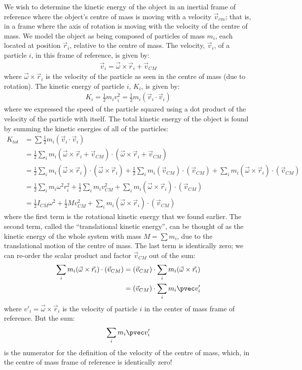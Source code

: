 We wish to determine the kinetic energy of the object in an inertial frame of reference where the object's centre of mass is moving with a velocity $\vec v_{cm}$; that is, in a frame where the axis of rotation is moving with the velocity of the centre of mass. We model the object as being composed of particles of mass $m_i$, each located at position $\vec r_i$, relative to the centre of mass. The velocity, $\vec v_i$, of a particle $i$, in this frame of reference, is given by:
\begin{align*}
\vec v_i = \vec\omega \times \vec r_i + \vec v_{CM}
\end{align*}
where $\vec\omega \times \vec r_i$ is the velocity of the particle as seen in the centre of mass (due to rotation). The kinetic energy of particle $i$, $K_i$, is given by:
\begin{align*}
K_i = \frac{1}{2}m_iv_i^2 = \frac{1}{2}m_i(\vec v_i\cdot \vec v_i)
\end{align*}
where we expressed the speed of the particle squared using a dot product of the velocity of the particle with itself. The total kinetic energy of the object is found by summing the kinetic energies of all of the particles:
\begin{align*}
K_{tot} &= \sum \frac{1}{2}m_i(\vec v_i\cdot \vec v_i) \\
&=\frac{1}{2} \sum_i m_i (\vec\omega \times \vec r_i + \vec v_{CM}) \cdot (\vec\omega \times \vec r_i + \vec v_{CM})\\
&=\frac{1}{2} \sum_i m_i (\vec\omega \times \vec r_i)\cdot(\vec\omega \times \vec r_i ) + \frac{1}{2} \sum_i m_i (\vec v_{CM}) \cdot (\vec v_{CM}) + \sum_i m_i (\vec\omega \times \vec r_i) \cdot (\vec v_{CM})\\
&=\frac{1}{2}  \sum_i m_i \omega^2r_i^2 + \frac{1}{2} \sum_i m_i v_{CM}^2 + \sum_i m_i (\vec\omega \times \vec r_i) \cdot (\vec v_{CM})\\
&=\frac{1}{2} I_{CM}\omega ^2 + \frac{1}{2}M v_{CM}^2+\sum_i m_i (\vec\omega \times \vec r_i) \cdot (\vec v_{CM})
\end{align*} 
where the first term is the rotational kinetic energy that we found earlier. The second term, called the ``translational kinetic energy'', can be thought of as the kinetic energy of the whole system with mass $M=\sum m_i$, due to the translational motion of the centre of mass. The last term is identically zero; we can re-order the scalar product and factor $\vec v_{CM}$ out of the sum:
\begin{align*}
\sum_i m_i (\vec\omega \times \vec r_i) \cdot (\vec v_{CM}) &= (\vec v_{CM}) \cdot \sum_i m_i (\vec\omega \times \vec r_i)\\
&=(\vec v_{CM}) \cdot \sum_i m_i \pvec v'_{i}
\end{align*}
where $v'_{i} = \vec\omega \times \vec r_i$ is the velocity of particle $i$ in the center of mass frame of reference. But the sum:
\begin{align*}
\sum_i m_i \pvec v'_{i}
\end{align*}
is the numerator for the definition of the velocity of the centre of mass, which, in the centre of mass frame of reference is identically zero!

